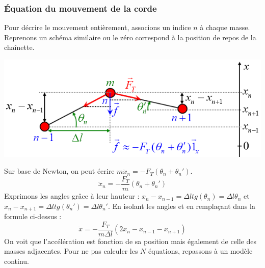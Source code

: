 \documentclass	[11pt, a4paper, openany]{book}
\begin{document}
\subsubsection{Équation du mouvement de la corde}
Pour décrire le mouvement entièrement, associons un indice $n$ à chaque masse. Reprenons un schéma similaire ou le zéro correspond à la position de repos de la chaînette.
\begin{center}
\includegraphics[scale=0.55]{oo/image24.png}
\end{center}
Sur base de Newton, on peut écrire $m\ddot{x}_n = -F_T(\theta_n + \theta_n')$.
\begin{equation}
\ddot{x}_n = -\frac{F_T}{m}(\theta_n + \theta_n')
\end{equation}
Exprimons les angles grâce à leur hauteur  : $x_n - x_{n-1} = \Delta l tg(\theta_n) = \Delta l \theta_n$ et $x_n - x_{n+1} = \Delta l tg(\theta_n') = \Delta l \theta_n'$. En isolant les angles et en remplaçant dans la formule ci-dessus : 
\begin{equation}
\ddot{x} = -\frac{F_T}{m\Delta l}(2x_n - x_{n-1} - x_{n+1})
\end{equation}
On voit que l'accélération est fonction de sa position mais également de celle des masses adjacentes. Pour ne pas calculer les $N$ équations, repassons à un modèle continu.\\
\end{document}
